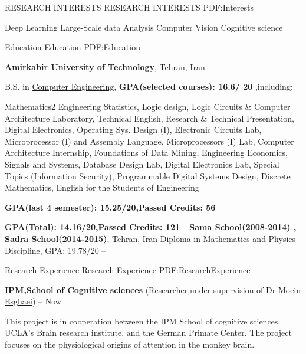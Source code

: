 \documentclass[letterpaper,MMMyyyy,nonstopmode]{simpleresumecv}
\begin{document}
\begin{Body}

\Section
{RESEARCH INTERESTS}
{RESEARCH INTERESTS}
{PDF:Interests}

\Entry

\BulletItem
Deep Learning
\BulletItem
Large-Scale data Analysis
\BulletItem
Computer Vision
\BulletItem
Cognitive science



\Section
{Education}
{Education}
{PDF:Education}

\Entry
\href{http://www.aut.ac.ir}
{\textbf{Amirkabir University of Technology}},
Tehran, Iran

\Gap
\BulletItem
B.S. in
\href{http://ceit.aut.ac.ir}
{Computer Engineering}, 
 \BulletItem
 \textbf {GPA(selected courses): 16.6/ 20} ,including:
 
Mathematics2
Engineering Statistics,
Logic design,
Logic Circuits & Computer Architecture Laboratory,
Technical English,
Research & Technical Presentation,
Digital Electronics,
Operating Sys. Design (I),
Electronic Circuits Lab,
Microprocessor (I) and Assembly Language,
Microprocessors (I) Lab,
Computer Architecture Internship,
Foundations of Data Mining,
Engineering Economics,
Signals and Systems,
Database Design Lab,
Digital Electronics Lab,
Special Topics (Information Security),
Programmable Digital Systems Design,
Discrete Mathematics,
English for the Students of Engineering

\Gap
\newline

\BulletItem
  \textbf {GPA(last 4 semester): 15.25/20,Passed Credits: 56}
 
 \BulletItem
 \textbf {GPA(Total): 14.16/20,Passed Credits: 121}
\hfill
{} --  
\href{}
\Entry
{\textbf{Sama School(2008-2014) , Sadra School(2014-2015)}},
Tehran, Iran
\BulletItem
Diploma in Mathematics and Physics Discipline, 
GPA: 19.78/20
\hfill
{}--

\begin{Detail}

\end{Detail}


\BullENCE %

\Section
{Research Experience}
{Research Experience}
{PDF:ResearchExperience}

\Entry
\href{}
\BulletItem
{\textbf{IPM,School of Cognitive sciences}} 
\newline (Researcher,under supervision of \href{https://scholar.google.de/citations?user=H3AwrOAAAAAJ&hl=en}{Dr Moein Esghaei})
\hfill
{} --
Now
\begin{Detail}
\SubBulletItem
This project is in cooperation between the IPM School of cognitive sciences, UCLA’s Brain research institute, and the German Primate Center. The project focuses on the physiological origins of attention in the monkey brain.  
\end{Detail}



\end{Body}
\end{document}

